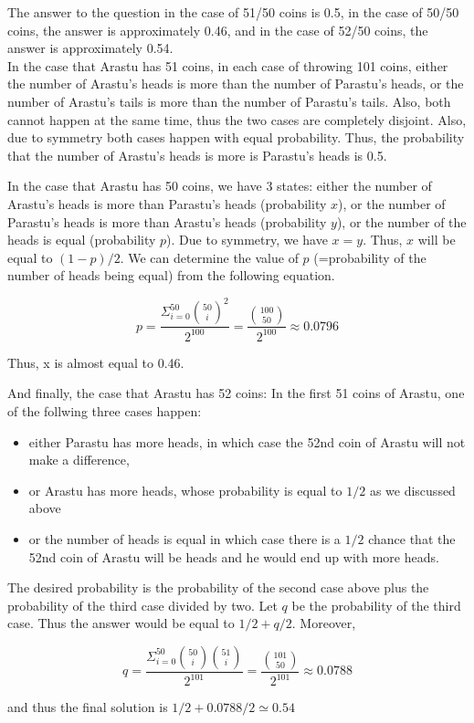 \begin{solution}
The answer to the question in the case of 51/50 coins is 0.5, in the case of 50/50 coins, the answer is approximately 0.46, and in the case of 52/50 coins, the answer is approximately 0.54.\\[0.2cm]

In the case that Arastu has 51 coins, in each case of throwing 101 coins, either the number of Arastu's heads is more than the number of Parastu's heads, or the number of Arastu's tails is more than the number of Parastu's tails. Also, both cannot happen at the same time, thus the two cases are completely disjoint. Also, due to symmetry both cases happen with equal probability. Thus, the probability that the number of Arastu's heads is more is Parastu's heads is 0.5.

In the case that Arastu has 50 coins, we have 3 states: either the number of Arastu's heads is more than Parastu's heads (probability $x$), or the number of Parastu's heads is more than Arastu's heads (probability $y$), or the number of the heads is equal (probability $p$). Due to symmetry, we have $x=y$. Thus, $x$ will be equal to $(1-p)/2$.
We can determine  the value of $p$ (=probability of the number of heads being equal) from the following equation. 

$$
p = \frac{\Sigma_{i=0}^{50}{50 \choose i}^2}{2^{100}} = \frac{{100 \choose 50}}{2^{100}} \approx 0.0796
$$

Thus, x is almost equal to 0.46.


And finally, the case that Arastu has 52 coins: In the first 51 coins of Arastu, one of the follwing three cases happen:
\begin{itemize}
\item either Parastu has more heads, in which case the 52nd coin of Arastu will not make a difference,
\item or Arastu has more heads, whose probability is equal to $1/2$ as we discussed above
\item or the number of heads is equal in which case there is a $1/2$ chance that the 52nd coin of Arastu will be heads and he would end up with more heads. 
\end{itemize}

The desired probability is the probability of the second case above plus the probability of the third case divided by two. Let $q$ be the probability of the third case. Thus the answer would be equal to $1/2 + q/2$. Moreover,

$$
q = \frac{\Sigma_{i=0}^{50}{50 \choose i}{51 \choose i}}{2^{101}} = \frac{{101 \choose 50}}{2^ {101}} \approx 0.0788
$$

and thus the final solution is $1/2 + 0.0788/2 \simeq 0.54$
\end{solution}